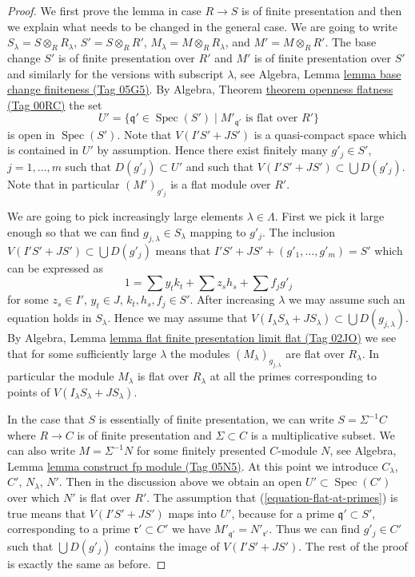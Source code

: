 \documentclass{amsart}
\theoremstyle{plain}
\theoremstyle{definition}
\theoremstyle{remark}
\numberwithin{equation}{subsection}
\def\Spec{\mathop{\mathrm{Spec}}}
\begin{document}
\begin{proof}
We first prove the lemma in case $R \to S$ is of finite presentation
and then we explain what needs to be changed in the general case.
We are going to write $S_\lambda = S \otimes_R R_\lambda$,
$S' = S \otimes_R R'$, $M_\lambda = M \otimes_R R_\lambda$, and
$M' = M \otimes_R R'$.
The base change $S'$ is of finite presentation over $R'$ and
$M'$ is of finite presentation over $S'$ and similarly for the
versions with subscript $\lambda$, see
Algebra, Lemma \href{https://stacks.math.columbia.edu/tag/05G5}{lemma base change finiteness (Tag 05G5)}.
By
Algebra, Theorem \href{https://stacks.math.columbia.edu/tag/00RC}{theorem openness flatness (Tag 00RC)}
the set
$$
U' = \{\mathfrak q' \in \Spec(S') \mid
M'_{\mathfrak q'}\text{ is flat over }R'\}
$$
is open in $\Spec(S')$. Note that $V(I'S' + JS')$
is a quasi-compact space which is contained in $U'$ by assumption.
Hence there exist finitely many $g'_j \in S'$, $j = 1, \ldots, m$
such that $D(g'_j) \subset U'$ and such
that $V(I'S' + JS') \subset \bigcup D(g'_j)$.
Note that in particular $(M')_{g'_j}$ is a flat module over $R'$.

\medskip\noindent
We are going to pick increasingly large elements $\lambda \in \Lambda$.
First we pick it large enough so that we can find
$g_{j, \lambda} \in S_{\lambda}$ mapping to $g'_j$.
The inclusion $V(I'S' + JS') \subset \bigcup D(g'_j)$ means that
$I'S' + JS' + (g'_1, \ldots, g'_m) = S'$ which can be expressed as
$$
1 = \sum y_tk_t + \sum z_sh_s + \sum f_jg'_j
$$
for some $z_s \in I'$, $y_t \in J$, $k_t, h_s, f_j \in S'$.
After increasing $\lambda$ we may assume such an equation holds in
$S_\lambda$. Hence we may assume that
$V(I_\lambda S_\lambda + J S_\lambda) \subset \bigcup D(g_{j, \lambda})$. By
Algebra, Lemma \href{https://stacks.math.columbia.edu/tag/02JO}{lemma flat finite presentation limit flat (Tag 02JO)}
we see that for some sufficiently large $\lambda$ the modules
$(M_\lambda)_{g_{j, \lambda}}$ are flat over $R_\lambda$.
In particular the module $M_\lambda$ is flat over $R_\lambda$
at all the primes corresponding to points of
$V(I_\lambda S_\lambda + J S_\lambda)$.

\medskip\noindent
In the case that $S$ is essentially of finite presentation, we can write
$S = \Sigma^{-1}C$ where $R \to C$ is of finite presentation and
$\Sigma \subset C$ is a multiplicative subset. We can also write
$M = \Sigma^{-1}N$ for some finitely presented $C$-module $N$, see
Algebra, Lemma \href{https://stacks.math.columbia.edu/tag/05N5}{lemma construct fp module (Tag 05N5)}.
At this point we introduce $C_\lambda$, $C'$, $N_\lambda$, $N'$. Then in
the discussion above we obtain an open $U' \subset \Spec(C')$
over which $N'$ is flat over $R'$. The assumption that
(\ref{equation-flat-at-primes}) is true means that $V(I'S' + JS')$ maps
into $U'$, because for a prime $\mathfrak q' \subset S'$, corresponding
to a prime $\mathfrak r' \subset C'$ we have
$M'_{\mathfrak q'} = N'_{\mathfrak r'}$. Thus we can find
$g'_j \in C'$ such that $\bigcup D(g'_j)$ contains the image of
$V(I'S' + JS')$. The rest of the proof is exactly the same as before.
\end{proof}
\end{document}
